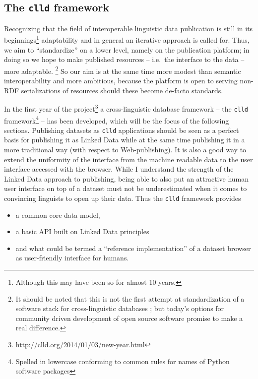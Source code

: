 \documentclass[a4paper,10pt]{article}
\begin{document}
\subsection{The \texttt{clld} framework}
Recognizing that the field of interoperable linguistic data publication is still in its
beginnings\footnote{Although this may have been so for almost 10 years.} adaptability and in general an
iterative approach is called for. Thus, we aim to ``standardize'' on a lower
level, namely on the publication platform; in doing so we hope to make published
resources -- i.e.~the interface to the data -- more adaptable.%
\footnote{It should be noted that this is not the first attempt at standardization of a software stack for cross-linguistic databases \cite{dimitriadis2002}; but today's options for community driven development of open source software promise to make a real difference.}
So our aim is at the same time more modest than
semantic interoperability and more ambitious, because the platform is open to serving non-RDF serializations
of resources should these become de-facto standards.

In the first year of the project\footnote{\url{http://clld.org/2014/01/03/new-year.html}} a cross-linguistic database framework -- the \texttt{clld} framework\footnote{Spelled in lowercase conforming to common rules for names of Python software packages} -- has been
developed, which will be the focus of the following sections.
Publishing datasets as \texttt{clld} applications should be seen as a perfect basis for publishing it as Linked Data while at the same time publishing it in a more traditional way (with respect to Web-publishing). It is also a good way to extend the uniformity of the interface from the machine readable data to the user interface accessed with the browser.
While I understand the strength of the Linked Data approach to publishing, being able to also put an attractive human user interface on top of a dataset must not be underestimated when it comes to convincing linguists to open up their data.
Thus the \texttt{clld} framework provides
\begin{itemize}
\item a common core data model,
\item a basic API built on Linked Data principles
\item and what could be termed a ``reference implementation'' of a dataset browser as user-friendly
interface for humans.
\end{itemize}
\end{document}

